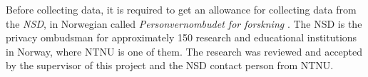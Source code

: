     Before collecting data, it is required to get an allowance for collecting data from the {\it NSD}, in Norwegian called {\it Personvernombudet for forskning} \cite{personvernombud}. The NSD is the privacy ombudsman for approximately 150 research and educational institutions in Norway, where NTNU is one of them. The research was reviewed and accepted by the supervisor of this project and the NSD contact person from NTNU. 

\clearpage
\mbox{}
\newpage
